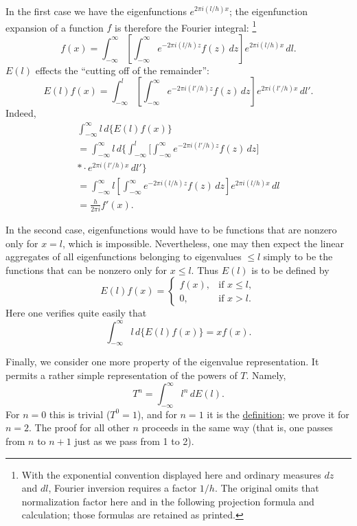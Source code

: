 \documentclass[fontsize=13pt,paper=b5,twoside,bookmarkpackage=false]{scrartcl}
\newcounter{translatornote}
\newcommand{\tnote}[1]{%
  \begingroup\stepcounter{translatornote}%
  \renewcommand{\thefootnote}{T\arabic{translatornote}}%
  \footnote[0]{#1}\endgroup}
\begin{document}
In the first case we have the eigenfunctions $e^{2\pi i(l/h)x}$; the eigenfunction expansion of a function $f$ is therefore the Fourier integral:\tnote{With the exponential convention displayed here and ordinary measures $dz$ and $dl$, Fourier inversion requires a factor $1/h$. The original omits that normalization factor here and in the following projection formula and calculation; those formulas are retained as printed.}
\[
 f(x)=\int_{-\infty}^{\infty}
 \left[\int_{-\infty}^{\infty}e^{-2\pi i(l/h)z}f(z)\,dz\right]
 e^{2\pi i(l/h)x}\,dl.
\]
$E(l)$ effects the ``cutting off of the remainder'':
\label{eq:X:fourier-projection}
\[
 E(l)f(x)=\int_{-\infty}^{l}
 \left[\int_{-\infty}^{\infty}e^{-2\pi i(l'/h)z}f(z)\,dz\right]
 e^{2\pi i(l'/h)x}\,dl'.
\]
Indeed,
\begin{gather*}
 \int_{-\infty}^{\infty}l\,d\{E(l)f(x)\}
 \\
 =\int_{-\infty}^{\infty}l\,d\Biggl\{
 \int_{-\infty}^{l}
 \Biggl[\int_{-\infty}^{\infty}e^{-2\pi i(l'/h)z}f(z)\,dz\Biggr]\\*
 {}\cdot e^{2\pi i(l'/h)x}\,dl'\Biggr\}\\
 =\int_{-\infty}^{\infty}l
 \left[\int_{-\infty}^{\infty}e^{-2\pi i(l/h)z}f(z)\,dz\right]
 e^{2\pi i(l/h)x}\,dl\\
 =\frac{h}{2\pi i}f'(x).
\end{gather*}

In the second case, eigenfunctions would have to be functions that are nonzero only for $x=l$, which is impossible. Nevertheless, one may then expect the linear aggregates of all eigenfunctions belonging to eigenvalues $\leq l$ simply to be the functions that can be nonzero only for $x\leq l$. Thus $E(l)$ is to be defined by
\label{eq:X:position-projection}
\[
 E(l)f(x)=
 \begin{cases}
 f(x),&\text{if }x\leq l,\\
 0,&\text{if }x>l.
 \end{cases}
\]
Here one verifies quite easily that
\[
 \int_{-\infty}^{\infty}l\,d\{E(l)f(x)\}=xf(x).
\]

Finally, we consider one more property of the eigenvalue representation. It permits a rather simple representation of the powers of $T$. Namely,
\label{eq:X:powers}
\[
 T^n=\int_{-\infty}^{\infty}l^n\,dE(l).
\]
For $n=0$ this is trivial ($T^0=1$), and for $n=1$ it is the \hyperref[cond:IX:1]{definition}; we prove it for $n=2$. The proof for all other $n$ proceeds in the same way (that is, one passes from $n$ to $n+1$ just as we pass from 1 to 2).
\end{document}
